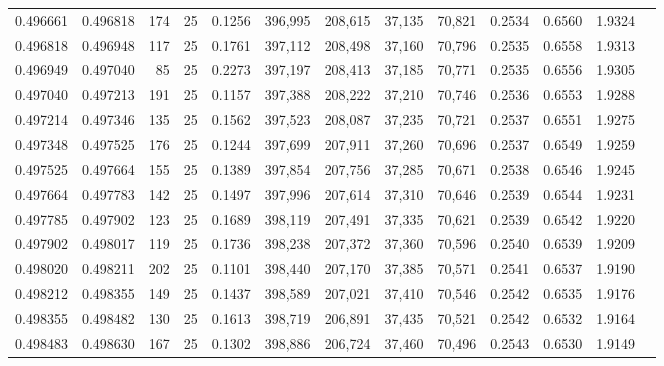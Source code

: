 \begin{tabular}{rrrrrrrrrrrrr}
0.496661 & 0.496818 &   174 &  25 &                                     0.1256 & 396,995 & 208,615 &  37,135 &  70,821 & 0.2534 & 0.6560 & 1.9324 \\
0.496818 & 0.496948 &   117 &  25 &                                     0.1761 & 397,112 & 208,498 &  37,160 &  70,796 & 0.2535 & 0.6558 & 1.9313 \\
0.496949 & 0.497040 &    85 &  25 &                                     0.2273 & 397,197 & 208,413 &  37,185 &  70,771 & 0.2535 & 0.6556 & 1.9305 \\
0.497040 & 0.497213 &   191 &  25 &                                     0.1157 & 397,388 & 208,222 &  37,210 &  70,746 & 0.2536 & 0.6553 & 1.9288 \\
0.497214 & 0.497346 &   135 &  25 &                                     0.1562 & 397,523 & 208,087 &  37,235 &  70,721 & 0.2537 & 0.6551 & 1.9275 \\
0.497348 & 0.497525 &   176 &  25 &                                     0.1244 & 397,699 & 207,911 &  37,260 &  70,696 & 0.2537 & 0.6549 & 1.9259 \\
0.497525 & 0.497664 &   155 &  25 &                                     0.1389 & 397,854 & 207,756 &  37,285 &  70,671 & 0.2538 & 0.6546 & 1.9245 \\
0.497664 & 0.497783 &   142 &  25 &                                     0.1497 & 397,996 & 207,614 &  37,310 &  70,646 & 0.2539 & 0.6544 & 1.9231 \\
0.497785 & 0.497902 &   123 &  25 &                                     0.1689 & 398,119 & 207,491 &  37,335 &  70,621 & 0.2539 & 0.6542 & 1.9220 \\
0.497902 & 0.498017 &   119 &  25 &                                     0.1736 & 398,238 & 207,372 &  37,360 &  70,596 & 0.2540 & 0.6539 & 1.9209 \\
0.498020 & 0.498211 &   202 &  25 &                                     0.1101 & 398,440 & 207,170 &  37,385 &  70,571 & 0.2541 & 0.6537 & 1.9190 \\
0.498212 & 0.498355 &   149 &  25 &                                     0.1437 & 398,589 & 207,021 &  37,410 &  70,546 & 0.2542 & 0.6535 & 1.9176 \\
0.498355 & 0.498482 &   130 &  25 &                                     0.1613 & 398,719 & 206,891 &  37,435 &  70,521 & 0.2542 & 0.6532 & 1.9164 \\
0.498483 & 0.498630 &   167 &  25 &                                     0.1302 & 398,886 & 206,724 &  37,460 &  70,496 & 0.2543 & 0.6530 & 1.9149 \\

\end{tabular}
